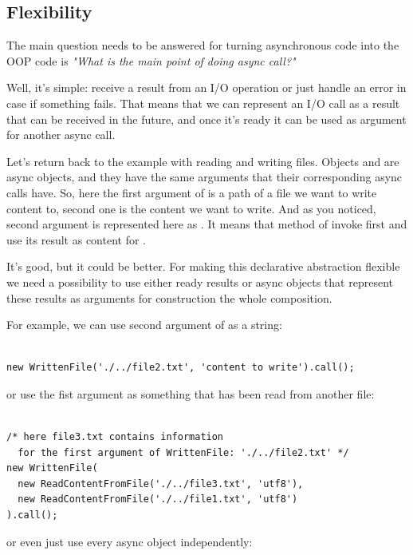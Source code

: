 \documentclass{article}
\newcommand{\cit}[1]{{\fontfamily{qcr}\selectfont{\textcolor{superdarkgray}{#1}}}}
\begin{document}
\subsection{Flexibility}

The main question needs to be answered for turning asynchronous code into the OOP code is \textit{"What is the main point of doing async call?"}

Well, it's simple: receive a result from an I/O operation or just handle an error in case if something fails. That means that we can represent an I/O call as a result that can be received in the future, and once it's ready it can be used as argument for another async call.

Let's return back to the example with reading and writing files. Objects \cit{WrittenFile} and \cit{ReadContentFromFile} are async objects, and they have the same arguments that their corresponding async calls have. So, here the first argument of \cit{WrittenFile} is a path of a file we want to write content to, second one is the content we want to write. And as you noticed, second argument is represented here as \cit{ReadContentFromFile}. It means that method \cit{call()} of \cit{WrittenFile} invoke first \cit{ReadContentFromFile} and use its result as content for \cit{WrittenFile}.

It's good, but it could be better. For making this declarative abstraction flexible we need a possibility to use either ready results or async objects that represent these results as arguments for construction the whole composition.

For example, we can use second argument of \cit{WrittenFile} as a string:

\begin{lstlisting}

new WrittenFile('./../file2.txt', 'content to write').call();

\end{lstlisting}
or use the fist argument as something that has been read from another file:

\begin{lstlisting}

/* here file3.txt contains information 
  for the first argument of WrittenFile: './../file2.txt' */
new WrittenFile(
  new ReadContentFromFile('./../file3.txt', 'utf8'), 
  new ReadContentFromFile('./../file1.txt', 'utf8')
).call();

\end{lstlisting}
or even just use every async object independently:
\end{document}

